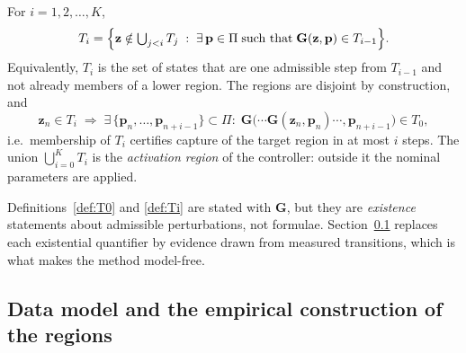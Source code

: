 \begin{definition}
\label{def:Ti}
For $i=1,2,\dots,K$,
\begin{equation}
T_i=\Bigl\{\mathbf{z}\notin\textstyle\bigcup_{j<i}T_j\;:\;
\exists\,\mathbf{p}\in\Pi \;\text{such that}\; \mathbf{G}(\mathbf{z},\mathbf{p})\in T_{i-1}\Bigr\}.
\label{eq:def-Ti}
\end{equation}
Equivalently, $T_i$ is the set of states that are one admissible step from
$T_{i-1}$ and not already members of a lower region. The regions are disjoint
by construction, and
\begin{equation}
\mathbf{z}_n\in T_i \;\Longrightarrow\;
\exists\,\{\mathbf{p}_n,\dots,\mathbf{p}_{n+i-1}\}\subset\Pi:\;
\mathbf{G}\bigl(\cdots\mathbf{G}(\mathbf{z}_n,\mathbf{p}_n)\cdots,\mathbf{p}_{n+i-1}\bigr)\in T_0 ,
\label{eq:reachability}
\end{equation}
i.e.\ membership of $T_i$ certifies capture of the target region in at most $i$
steps. The union $\bigcup_{i=0}^{K}T_i$ is the \emph{activation region} of the
controller: outside it the nominal parameters are applied.
\end{definition}

\begin{remark}
Definitions~\ref{def:T0} and \ref{def:Ti} are stated with $\mathbf{G}$, but they
are \emph{existence} statements about admissible perturbations, not formulae.
Section~\ref{subsec:ecr-data} replaces each existential quantifier by evidence
drawn from measured transitions, which is what makes the method model-free.
\end{remark}

\subsection{Data model and the empirical construction of the regions}
\label{subsec:ecr-data}

